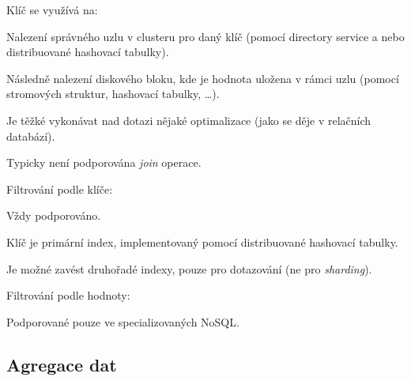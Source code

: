 \begin{compactitem}
    \item Klíč se využívá na: \begin{compactitem}
        \item Nalezení správného uzlu v clusteru pro daný klíč (pomocí directory service a nebo distribuované hashovací tabulky).

        \item Následně nalezení diskového bloku, kde je hodnota uložena v rámci uzlu (pomocí stromových struktur, hashovací tabulky, \dots).
    \end{compactitem}

    \item Je těžké vykonávat nad dotazi nějaké optimalizace (jako se děje v relačních databází).

    \item Typicky není podporována \textit{join} operace.

    \item Filtrování podle klíče: \begin{compactitem}
        \item Vždy podporováno.
        \item Klíč je primární index, implementovaný pomocí distribuované hashovací tabulky.
        \item Je možné zavést druhořadé indexy, pouze pro dotazování (ne pro \textit{sharding}).
    \end{compactitem}

    \item Filtrování podle hodnoty: \begin{compactitem}
        \item Podporované pouze ve specializovaných NoSQL.
    \end{compactitem}
\end{compactitem}

\subsection{Agregace dat}

